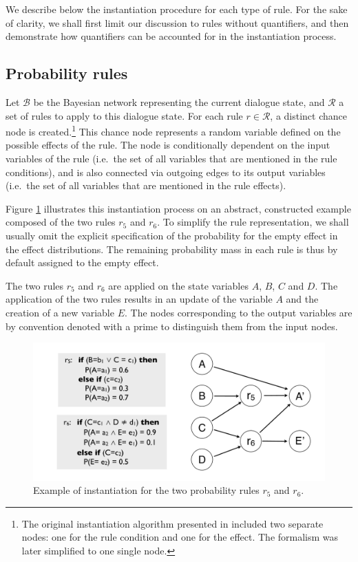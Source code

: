 We describe below the instantiation procedure for each type of rule. For the sake of clarity, we shall first limit our discussion to rules without quantifiers, and then demonstrate how quantifiers can be accounted for in the instantiation process. 

\subsection{Probability rules}
\label{sec:probruleinstantiation}

Let $\mathcal{B}$ be the Bayesian network representing the current dialogue state, and $\mathcal{R}$ a set of rules to apply to this dialogue state.  For each rule $r \in \mathcal{R}$, a distinct chance node is created.\footnote{The original instantiation algorithm presented in \citep{rulebasedmodels-sigdial2012} included two separate nodes: one for the rule condition and one for the effect.  The formalism was later simplified to one single node.} This chance node represents a random variable defined on the possible effects of the rule.  The node is conditionally dependent on the input variables of the rule (i.e.\ the set of all variables that are mentioned in the rule conditions), and is also connected via outgoing edges to its output variables (i.e.\ the set of all variables that are mentioned in the rule effects). 

Figure \ref{fig:instantiationprob} illustrates this instantiation process on an abstract, constructed example composed of the two rules $r_5$ and $r_6$.  To simplify the rule representation, we shall usually omit the explicit specification of the probability for the empty effect in the effect distributions.  The remaining probability mass in each rule is thus by default assigned to the empty effect.

The two rules $r_5$ and $r_6$ are applied on the state variables $A$, $B$, $C$ and $D$.  The application of the two rules results in an update of the variable $A$ and the creation of a new variable $E$. The nodes corresponding to the output variables are by convention denoted with a prime to distinguish them from the input nodes.  

\begin{figure}[h]
\centering
\includegraphics[scale=0.25]{imgs/ruleinstantiation.pdf}
\caption{Example of instantiation for the two probability rules $r_5$ and $r_6$. }
\label{fig:instantiationprob}
\end{figure}

